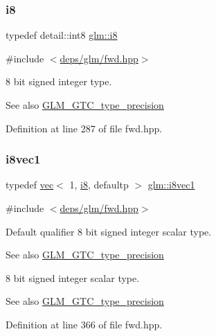 \subsubsection{\texorpdfstring{i8}{i8}}
{\footnotesize\ttfamily typedef detail\+::int8 \hyperlink{group__gtc__type__precision_gaae064be68b7d36cd7910c16e8ad18bba}{glm\+::i8}}



{\ttfamily \#include $<$\hyperlink{fwd_8hpp}{deps/glm/fwd.\+hpp}$>$}

8 bit signed integer type. \begin{DoxySeeAlso}{See also}
\hyperlink{group__gtc__type__precision}{G\+L\+M\+\_\+\+G\+T\+C\+\_\+type\+\_\+precision} 
\end{DoxySeeAlso}


Definition at line 287 of file fwd.\+hpp.

\mbox{\label{group__gtc__type__precision_ga1e3db56de9a181840090416b6a5bd5f7}} 
\subsubsection{\texorpdfstring{i8vec1}{i8vec1}}
{\footnotesize\ttfamily typedef \hyperlink{structglm_1_1vec}{vec}$<$ 1, \hyperlink{group__gtc__type__precision_gaae064be68b7d36cd7910c16e8ad18bba}{i8}, defaultp $>$ \hyperlink{group__gtc__type__precision_ga1e3db56de9a181840090416b6a5bd5f7}{glm\+::i8vec1}}



{\ttfamily \#include $<$\hyperlink{fwd_8hpp}{deps/glm/fwd.\+hpp}$>$}

Default qualifier 8 bit signed integer scalar type. \begin{DoxySeeAlso}{See also}
\hyperlink{group__gtc__type__precision}{G\+L\+M\+\_\+\+G\+T\+C\+\_\+type\+\_\+precision}
\end{DoxySeeAlso}
8 bit signed integer scalar type. \begin{DoxySeeAlso}{See also}
\hyperlink{group__gtc__type__precision}{G\+L\+M\+\_\+\+G\+T\+C\+\_\+type\+\_\+precision} 
\end{DoxySeeAlso}


Definition at line 366 of file fwd.\+hpp.

\mbox{\label{group__gtc__type__precision_gade57e4b55fe2b2345a4f2ac2b149cd32}} 
